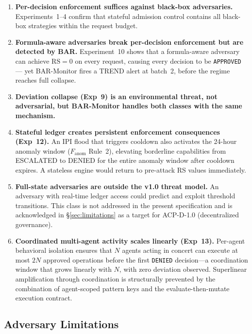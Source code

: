 \documentclass[11pt]{article}
\theoremstyle{definition}
\begin{document}
\begin{enumerate}[noitemsep]
  \item \textbf{Per-decision enforcement suffices against black-box adversaries.}
        Experiments~1--4 confirm that stateful admission control contains all
        black-box strategies within the request budget.
  \item \textbf{Formula-aware adversaries break per-decision enforcement but are
        detected by BAR.}
        Experiment~10 shows that a formula-aware adversary can achieve
        $\mathrm{RS}=0$ on every request, causing every decision to be
        \texttt{APPROVED} — yet BAR-Monitor fires a TREND alert at batch~2,
        before the regime reaches full collapse.
  \item \textbf{Deviation collapse (Exp~9) is an environmental threat, not adversarial,
        but BAR-Monitor handles both classes with the same mechanism.}
  \item \textbf{Stateful ledger creates persistent enforcement consequences (Exp~12).}
        An IPI flood that triggers cooldown also activates the 24-hour anomaly
        window ($F_\text{anom}$ Rule~2), elevating borderline capabilities from
        ESCALATED to DENIED for the entire anomaly window after cooldown expires.
        A stateless engine would return to pre-attack RS values immediately.
  \item \textbf{Full-state adversaries are outside the v1.0 threat model.}
        An adversary with real-time ledger access could predict and exploit
        threshold transitions.
        This class is not addressed in the present specification
        and is acknowledged in \S\ref{sec:limitations}
        as a target for ACP-D-1.0 (decentralized governance).
  \item \textbf{Coordinated multi-agent activity scales linearly (Exp~13).}
        Per-agent behavioral isolation ensures that $N$ agents acting in
        concert can execute at most $2N$ approved operations before the first
        \texttt{DENIED} decision---a coordination window that grows linearly
        with $N$, with zero deviation observed.
        Superlinear amplification through coordination is structurally
        prevented by the combination of agent-scoped pattern keys and the
        evaluate-then-mutate execution contract.
\end{enumerate}

\subsection{Adversary Limitations}
\end{document}
